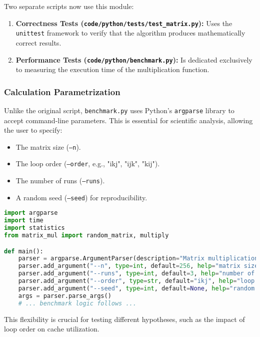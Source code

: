 \documentclass[a4paper]{article}
\begin{document}
Two separate scripts now use this module:
\begin{enumerate}
    \item \textbf{Correctness Tests (\texttt{code/python/tests/test\_matrix.py}):} Uses the \texttt{unittest} framework to verify that the algorithm produces mathematically correct results.
    \item \textbf{Performance Tests (\texttt{code/python/benchmark.py}):} Is dedicated exclusively to measuring the execution time of the multiplication function.
\end{enumerate}

\subsubsection{Calculation Parametrization}
Unlike the original script, \texttt{benchmark.py} uses Python's \texttt{argparse} library to accept command-line parameters. This is essential for scientific analysis, allowing the user to specify:
\begin{itemize}
    \item The matrix size (\texttt{--n}).
    \item The loop order (\texttt{--order}, e.g., "ikj", "ijk", "kij").
    \item The number of runs (\texttt{--runs}).
    \item A random seed (\texttt{--seed}) for reproducibility.
\end{itemize}

\begin{lstlisting}[language=Python, caption={Argument parsing in 'benchmark.py'}]
import argparse
import time
import statistics
from matrix_mul import random_matrix, multiply

def main():
    parser = argparse.ArgumentParser(description="Matrix multiplication benchmark (pure Python)")
    parser.add_argument("--n", type=int, default=256, help="matrix size n (n x n)")
    parser.add_argument("--runs", type=int, default=3, help="number of timed runs")
    parser.add_argument("--order", type=str, default="ikj", help="loop order: ikj, ijk, ...")
    parser.add_argument("--seed", type=int, default=None, help="random seed (None = random)")
    args = parser.parse_args()
    # ... benchmark logic follows ...
\end{lstlisting}

This flexibility is crucial for testing different hypotheses, such as the impact of loop order on cache utilization.
\end{document}
